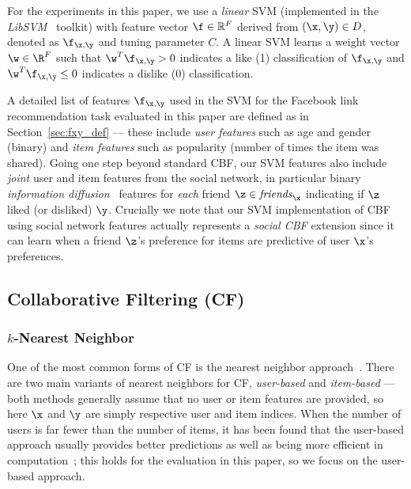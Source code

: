 For the experiments in this paper, we use a \emph{linear} SVM
(implemented in the \emph{LibSVM}~\cite{libsvm} toolkit) with feature
vector $\f \in \mathbb{R}^F$ derived from $(\x,\y) \in D$, denoted as
$\f_{\x,\y}$ and tuning parameter $C$.  A linear SVM learns a weight
vector $\w \in
\R^F$ such that $\w^T \f_{\x,\y} > 0$ indicates a 
like (1) classification of $\f_{\x,\y}$ and $\w^T \f_{\x,\y} \leq 0$
indicates a dislike (0) classification.

A detailed list of features $\f_{\x,\y}$ used in the SVM for the Facebook link
recommendation task evaluated in this paper are defined as in
Section~\ref{sec:fxy_def} --- these include \emph{user features} such
as age and gender (binary) and \emph{item features} such as popularity
(number of times the item was shared).  Going one step beyond standard
CBF, our SVM features also include \emph{joint} user and item
features from the social network, in particular binary 
\emph{information diffusion}~\cite{inf_diffusion} features
for \emph{each} friend $\z \in \mathit{friends}_\x$ indicating if $\z$
liked (or disliked) $\y$.  Crucially we note that our SVM
implementation of CBF using social network features actually
represents a \emph{social CBF} extension since it can learn when a friend
$\z$'s preference for items are predictive of user $\x$'s preferences.

\subsection{Collaborative Filtering (CF)}

\subsubsection{$k$-Nearest Neighbor}
\label{sec:nn}

One of the most common forms of CF is the nearest neighbor
approach~\cite{bellkor}. 
There are two main variants of nearest neighbors for
CF, \emph{user-based} and \emph{item-based} --- both
methods generally assume that no user or item features are provided,
so here $\x$ and $\y$ are simply respective user and item indices.
When the
number of users is far fewer than the number of items, it has been
found that the user-based approach usually provides better predictions
as well as being more efficient in computation~\cite{bellkor};
this holds for the evaluation in this paper, so 
we focus on the user-based approach.

